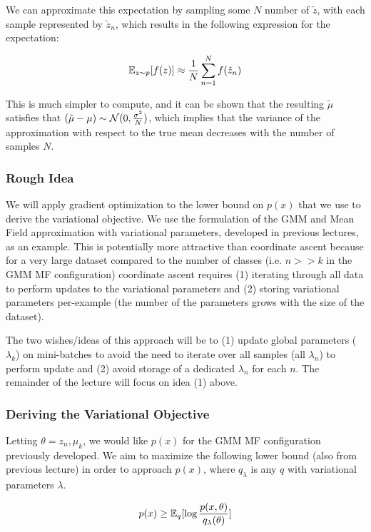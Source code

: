 \documentclass{article}
\begin{document}
We can approximate this expectation by sampling some $N$ number of $\tilde{z}$, with each sample represented by $\tilde{z}_n$, which results in the following expression for the expectation:

$$
\mathbb{E}_{z \sim p}[f(z)] \approx \frac{1}{N} \sum_{n=1}^{N} f(\tilde{z}_n)
$$

This is much simpler to compute, and it can be shown that the resulting $\tilde{\mu}$ satisfies that $(\tilde{\mu}- \mu) \sim \mathcal{N}(0, \frac{\sigma^2}{N})$, which implies that the variance of the approximation with respect to the true mean decreases with the number of samples $N$.

\subsubsection{Rough Idea}

We will apply gradient optimization to the lower bound on $p(x)$ that we use to derive the variational objective.  
We use the formulation of the GMM and Mean Field approximation with variational parameters, developed in previous lectures, as an example.  
This is potentially more attractive than coordinate ascent because for a very large dataset compared to the number of classes (i.e. $n >> k$ in the GMM MF configuration) coordinate ascent requires (1) iterating through all data to perform updates to the variational parameters and (2) storing variational parameters per-example (the number of the parameters grows with the size of the dataset).


The two wishes/ideas of this approach will be to (1) update global parameters ($\lambda_k$) on mini-batches to avoid the need to iterate over all samples (all $\lambda_n$) to perform update and (2) avoid storage of a dedicated $\lambda_n$ for each $n$.
The remainder of the lecture will focus on idea (1) above.


\subsubsection{Deriving the Variational Objective}

Letting $\theta = {z_n, \mu_k}$, we would like $p(x)$ for the GMM MF configuration previously developed.  
We aim to maximize the following lower bound (also from previous lecture) in order to approach $p(x)$, where $q_{\lambda}$ is any $q$ with variational parameters $\lambda$.

$$
p(x) \geq \mathbb{E}_q [\log{\frac{p(x, \theta)}{q_{\lambda}(\theta)}} ]
$$
\end{document}
